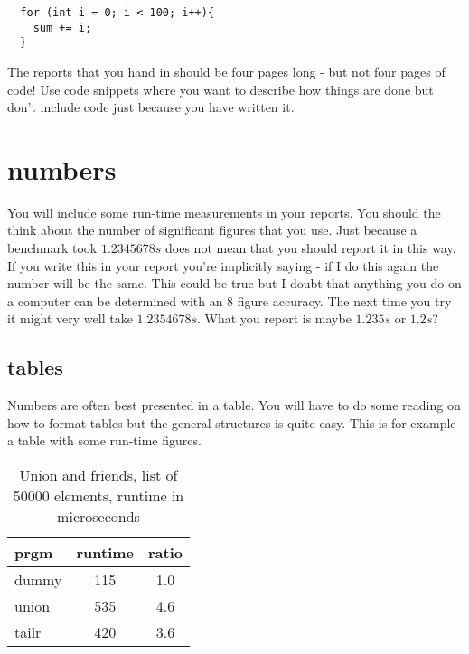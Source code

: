 \documentclass[a4paper,11pt]{article}
\begin{document}
\begin{verbatim}
  for (int i = 0; i < 100; i++){
    sum += i;
  }
\end{verbatim}

The reports that you hand in should be four pages long - but not four
pages of code! Use code snippets where you want to describe how things
are done but don't include code just because you have written it.

\section*{numbers}

You will include some run-time measurements in your reports. You
should the think about the number of significant figures that you
use. Just because a benchmark took $1.2345678 s$ does not mean that
you should report it in this way. If you write this in your report
you're implicitly saying - if I do this again the number will be the
same. This could be true but I doubt that anything you do on a
computer can be determined with an 8 figure accuracy. The next time
you try it might very well take $1.2354678 s$. What you report is
maybe $1.235 s$ or $1.2 s$?

\subsection*{tables}

Numbers are often best presented in a table. You will have to do some
reading on how to format tables but the general structures is quite
easy. This is for example a table with some run-time figures.

\begin{table}[h]
  \begin{center}
    \begin{tabular}{l|c|c}
      \textbf{prgm} & \textbf{runtime} & \textbf{ratio} \\
      \hline
      dummy         & 115              & 1.0            \\
      union         & 535              & 4.6            \\
      tailr         & 420              & 3.6            \\
    \end{tabular}
    \caption{Union and friends, list of 50000 elements, runtime in microseconds}
    \label{tab:table1}
  \end{center}
\end{table}
\end{document}
